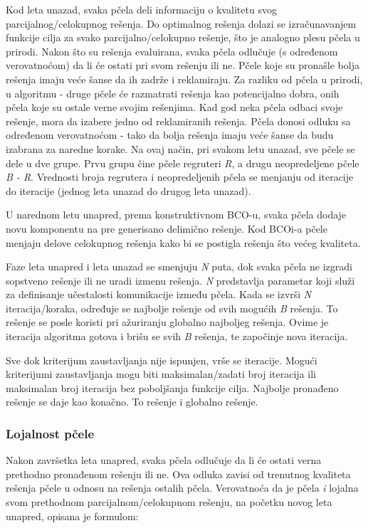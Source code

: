 \documentclass[a4paper]{article}
\begin{document}
{Kod leta unazad, svaka pčela deli informaciju o kvalitetu svog parcijalnog/celokupnog rešenja. Do optimalnog rešenja dolazi se izračunavanjem funkcije cilja za svako parcijalno/celokupno rešenje, što je analogno plesu pčela u prirodi. Nakon što su rešenja evaluirana, svaka pčela odlučuje (s određenom verovatnoćom) da li će ostati pri svom rešenju ili ne. Pčele koje su pronašle bolja rešenja imaju veće šanse da ih zadrže i reklamiraju. Za razliku od pčela u prirodi, u algoritmu - druge pčele će razmatrati rešenja kao potencijalno dobra, onih pčela koje su ostale verne svojim rešenjima. Kad god neka pčela odbaci svoje rešenje, mora da izabere jedno od reklamiranih rešenja. Pčela donosi odluku sa određenom verovatnoćom - tako da bolja rešenja imaju veće šanse da budu izabrana za naredne korake. Na ovaj način, pri svakom letu unazad, sve pčele se dele u dve grupe. Prvu grupu čine pčele regruteri {\em R}, a drugu neopredeljene pčele {\em B - R}. Vrednosti broja regrutera i neopredeljenih pčela se menjanju od iteracije do iteracije (jednog leta unazad do drugog leta unazad)\cite{bcoalg}.

U narednom letu unapred, prema konstruktivnom BCO-u, svaka pčela dodaje novu komponentu na pre generisano delimično rešenje. Kod BCOi-a pčele menjaju delove celokupnog rešenja kako bi se postigla rešenja što većeg kvaliteta\cite{bcoalg}.

Faze leta unapred i leta unazad se smenjuju {\em N} puta, dok svaka pčela ne izgradi sopstveno rešenje ili ne uradi izmenu rešenja. {\em N} predstavlja parametar koji služi za definisanje učestalosti komunikacije između pčela. Kada se izvrši {\em N} iteracija/koraka, određuje se najbolje rešenje od svih mogućih {\em B} rešenja. To rešenje se posle koristi pri ažuriranju globalno najboljeg rešenja. Ovime je iteracija algoritma gotova i brišu se svih {\em B} rešenja, te započinje nova iteracija\cite{bcoalg}.

Sve dok kriterijum zaustavljanja nije ispunjen, vrše se iteracije. Mogući kriterijumi zaustavljanja mogu biti maksimalan/zadati broj iteracija ili maksimalan broj iteracija bez poboljšanja funkcije cilja.
Najbolje pronađeno rešenje se daje kao konačno. To rešenje i globalno rešenje.

\subsubsection{Lojalnost pčele}
\label{subsubsec:lojalnost}

Nakon završetka leta unapred, svaka pčela odlučuje da li će ostati verna prethodno pronađenom rešenju ili ne. Ova odluka zavisi od trenutnog kvaliteta rešenja pčele u odnosu na rešenja ostalih pčela. Verovatnoća da je pčela {\em i} lojalna svom prethodnom parcijalnom/celokupnom rešenju, na početku novog leta unapred, opisana je formulom:\\

}
\end{document}

